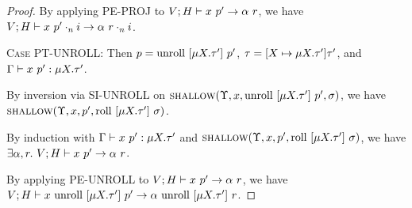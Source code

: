 \documentclass{article}
\begin{document}
\begin{proof}
    By applying \textsc{PE-PROJ} to ${{V};{H}} \vdash {{x}\ {p'}} \rightarrow {{\alpha}\ {r}}$,
    we have ${{V};{H}} \vdash {{x}\ {{p'}\cdot_{n} {i}}} \rightarrow {{\alpha}\ {{r}\cdot_{n} {i}}}$.

  \textsc{Case PT-UNROLL}:
    Then $p = \textrm{unroll}\ [{\mu {X}.{\tau'}}]\ {p'}$, $\tau = [{X} \mapsto {\mu {X}.{\tau'}}]{\tau'}$,
    and ${{\Gamma}} \vdash {{x}\ {p'}} : {{\mu {X}.{\tau'}}}$.

    By inversion via \textsc{SI-UNROLL} on
    $\textsc{shallow}({\Upsilon},{x},{\textrm{unroll}\ [{\mu {X}.{\tau'}}]\ {p'}},{\sigma})$, we have
    $\textsc{shallow}({\Upsilon},{x},{p'},{\textrm{roll}\ [{\mu {X}.{\tau'}}]\ {\sigma}})$.

    By induction with ${{\Gamma}} \vdash {{x}\ {p'}} : {{\mu {X}.{\tau'}}}$
    and $\textsc{shallow}({\Upsilon},{x},{p'},{\textrm{roll}\ [{\mu {X}.{\tau'}}]\ {\sigma}})$,
    we have $\exists \alpha, r.\ \PEval{V}{H}{x}{p'}{\alpha}{r}$.

    By applying \textsc{PE-UNROLL} to ${{V};{H}} \vdash {{x}\ {p'}} \rightarrow {{\alpha}\ {r}}$,
    we have ${{V};{H}} \vdash {{x}\ {\textrm{unroll}\ [{\mu {X}.{\tau'}}]\ {p'}}} \rightarrow {{\alpha}\ {\textrm{unroll}\ [{\mu {X}.{\tau'}}]\ {r}}}$.
\end{proof}
\end{document}
